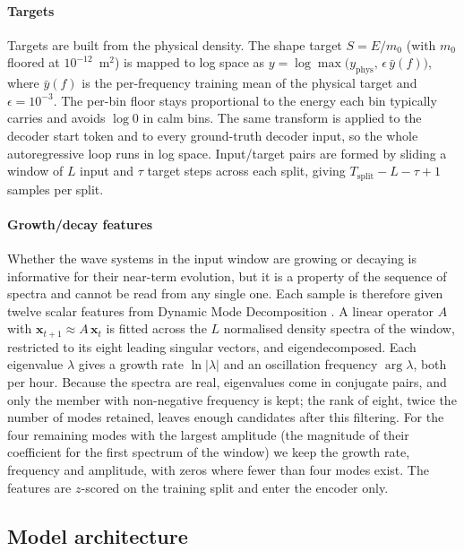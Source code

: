 \paragraph{Targets}
Targets are built from the physical density. The shape target $S = E/m_0$ (with $m_0$ floored at $10^{-12}$~m$^2$) is mapped to log space as $y = \log \max\!\big(y_{\text{phys}},\, \epsilon\,\bar{y}(f)\big)$, where $\bar{y}(f)$ is the per-frequency training mean of the physical target and $\epsilon = 10^{-3}$. The per-bin floor stays proportional to the energy each bin typically carries and avoids $\log 0$ in calm bins. The same transform is applied to the decoder start token and to every ground-truth decoder input, so the whole autoregressive loop runs in log space. Input/target pairs are formed by sliding a window of $L$ input and $\tau$ target steps across each split, giving $T_{\text{split}} - L - \tau + 1$ samples per split.

\paragraph{Growth/decay features}
Whether the wave systems in the input window are growing or decaying is informative for their near-term evolution, but it is a property of the sequence of spectra and cannot be read from any single one. Each sample is therefore given twelve scalar features from Dynamic Mode Decomposition \citep{schmid2010dmd}. A linear operator $A$ with $\mathbf{x}_{t+1} \approx A\,\mathbf{x}_t$ is fitted across the $L$ normalised density spectra of the window, restricted to its eight leading singular vectors, and eigendecomposed. Each eigenvalue $\lambda$ gives a growth rate $\ln|\lambda|$ and an oscillation frequency $\arg\lambda$, both per hour. Because the spectra are real, eigenvalues come in conjugate pairs, and only the member with non-negative frequency is kept; the rank of eight, twice the number of modes retained, leaves enough candidates after this filtering. For the four remaining modes with the largest amplitude (the magnitude of their coefficient for the first spectrum of the window) we keep the growth rate, frequency and amplitude, with zeros where fewer than four modes exist. The features are $z$-scored on the training split and enter the encoder only.

\subsection{Model architecture}
\label{sec:architecture}
 
